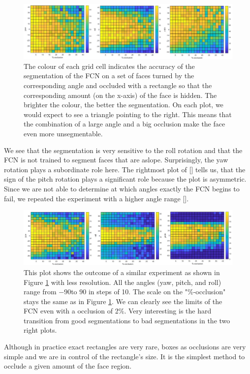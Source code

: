 \begin{figure}[H]
	\centering
	\includegraphics[width=\textwidth]{Figures/occVal_angles.png}
	\caption{The colour of each grid cell indicates the accuracy of the segmentation of the FCN on a set of faces turned by the corresponding angle and occluded with a rectangle so that the corresponding amount (on the x-axis) of the face is hidden. The brighter the colour, the better the segmentation. On each plot, we would expect to see a triangle pointing to the right. This means that the combination of a large angle and a big occlusion make the face even more unsegmentable.}
	\label{fig:occVal40}
\end{figure}

\pagebreak
 
We see that the segmentation is very sensitive to the roll rotation and that the FCN is not trained to segment faces that are aslope. Surprisingly, the yaw rotation plays a subordinate role here. The rightmost plot of [] tells us, that the sign of the pitch rotation plays a significant role because the plot is asymmetric. Since we are not able to determine at which angles exactly the FCN begins to fail, we repeated the experiment with a higher angle range [].

\begin{figure}[H]
	\centering
	\includegraphics[width=\textwidth]{Figures/occVal_angles_90.png}
	\caption{This plot shows the outcome of a similar experiment as shown in Figure \ref{fig:occVal40} with less resolution. All the angles (yaw, pitch, and roll) range from $-90$\textdegree to $90$ \textdegree in steps of 10\textdegree. The scale on the "\%-occlusion" stays the same as in Figure \ref{fig:occVal40}. We can clearly see the limits of the FCN even with a occlusion of 2\%. Very interesting is the hard transition from good segmentations to bad segmentations in the two right plots.}
	\label{fig:occVal90}
\end{figure}



Although in practice exact rectangles are very rare, boxes as occlusions are very simple and we are in control of the rectangle's size. It is the simplest method to occlude a given amount of the face region.
